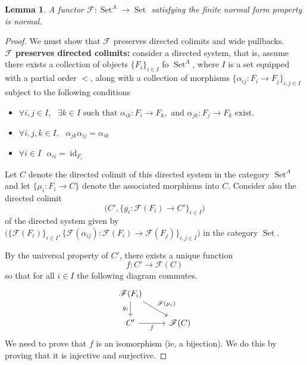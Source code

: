 \documentclass[12pt]{article}
\theoremstyle{plain}
\newtheorem{lemma}[thm]{Lemma}
\theoremstyle{definition}
\newcommand{\scr}[1]{\mathscr{#1}}
\newcommand{\lto}{\longrightarrow}
\DeclareMathOperator{\set}{Set}
\begin{document}
	\begin{lemma}\label{lem:normal_from_prop--->normal}
		A functor $\scr{F}: \set^A \lto \set$ satisfying the finite normal form property is normal.
		\end{lemma}
	\begin{proof}
		We must show that $\scr{F}$ preserves directed colimits and wide pullbacks.\\
		\textbf{$\scr{F}$ preserves directed colimits:} consider a directed system, that is, assume there exists a collection of objects $\lbrace F_i \rbrace_{i \in I}$ fo $\set^A$, where $I$ is a set equipped with a partial order $<$, along with a collection of morphisms $\lbrace \alpha_{ij}: F_i \lto F_j \rbrace_{i,j \in I}$ subject to the following conditions
		\begin{itemize}
			\item $\forall i, j \in I,\text{ }\exists k \in I\text{ such that }\alpha_{ik}: F_i \lto F_k, \text{ and } \alpha_{jk}: F_j \lto F_k\text{ exist.}$
			\item $\forall i,j,k \in I,\text{ }\alpha_{jk} \alpha_{ij} = \alpha_{ik}$
			\item $\forall i \in I\text{ }\alpha_{ii} = \operatorname{id}_{F_i}$
			\end{itemize}
		Let $C$ denote the directed colimit of this directed system in the category $\set^A$ and let $\{\mu_i: F_i \lto C\}$ denote the associated morphisms into $C$. Consider also the directed colimit
		\begin{equation}
			\big(C',\{g_i: \scr{F}(F_i) \lto C'\}_{i \in I}\big)
		\end{equation}
		of the directed system given by $\big(\lbrace \scr{F}( F_i) \rbrace_{i \in I}, \lbrace \scr{F}(\alpha_{ij}): \scr{F}(F_i) \lto \scr{F}(F_j)\rbrace_{i,j \in I}\big)$ in the category $\set$.
		
		By the universal property of $C'$, there exists a unique function
		\begin{equation}
			f: C' \lto \scr{F}(C)
			\end{equation}
		so that for all $i \in I$ the following diagram commutes.
		\begin{equation}
			\begin{tikzcd}
				\scr{F}(F_i)\arrow[d,swap,"{g_i}"]\arrow[dr,"{\scr{F}(\mu_i)}"]\\
				C'\arrow[r,swap,"{f}"] & \scr{F} (C)
				\end{tikzcd}
			\end{equation}
		We need to prove that $f$ is an isomorphism (ie, a bijection). We do this by proving that it is injective and surjective.
		

\end{proof}
\end{document}
